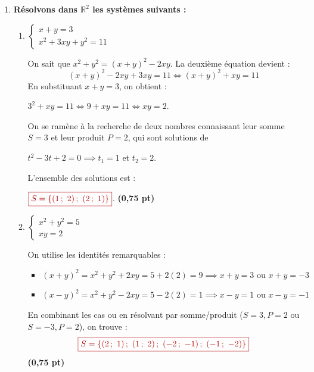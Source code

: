 \documentclass[12pt,a4paper]{article}
\newcommand{\redtitle}[1]{\textcolor{myred}{\textbf{#1}}}
\newcommand{\redbox}[1]{\color{myred}\boxed{#1}\color{black}}
\begin{document}
\begin{enumerate}
\begin{enumerate}
        L'ensemble des solutions est : 
        
        $\redbox{S = \left[ -\infty \,;~ -\dfrac{5}{2} \right] \cup ]-2 \,;~ 1] \cup ]5 \,;~ +\infty[}$. \hfill \textbf{(0,75 pt)}
    \end{enumerate}

    \item \redtitle{Résolvons dans $\mathbb{R}^2$ les systèmes suivants :}
    
    \begin{enumerate}
        \item $\begin{cases} x + y = 3 \\ x^2 + 3xy + y^2 = 11 \end{cases}$
        
        On sait que $x^2 + y^2 = (x+y)^2 - 2xy$. La deuxième équation devient :
        \[ (x+y)^2 - 2xy + 3xy = 11 \iff (x+y)^2 + xy = 11 \]
        En substituant $x+y=3$, on obtient :
        
         $3^2 + xy = 11 \iff 9 + xy = 11 \iff xy = 2$.
        
        On se ramène à la recherche de deux nombres connaissant leur somme $S=3$ et leur produit $P=2$, qui sont solutions de 
        
        $t^2 - 3t + 2 = 0 \implies t_1 = 1$ et $t_2 = 2$.
        
        L'ensemble des solutions est :
        
         $\redbox{S = \{(1 \,;~ 2) \,;~ (2 \,;~ 1)\}}$. \hfill \textbf{(0,75 pt)}
        
        \item $\begin{cases} x^2 + y^2 = 5 \\ xy = 2 \end{cases}$
        
        On utilise les identités remarquables :
        \begin{itemize}
            \item $(x+y)^2 = x^2 + y^2 + 2xy = 5 + 2(2) = 9 \implies x + y = 3 \text{ ou } x + y = -3$
            \item $(x-y)^2 = x^2 + y^2 - 2xy = 5 - 2(2) = 1 \implies x - y = 1 \text{ ou } x - y = -1$
        \end{itemize}
        En combinant les cas ou en résolvant par somme/produit ($S=3, P=2$ ou $S=-3, P=2$), on trouve :
        \[ \redbox{S = \{(2 \,;~ 1) \,;~ (1 \,;~ 2) \,;~ (-2 \,;~ -1) \,;~ (-1 \,;~ -2)\}} \] \hfill \textbf{(0,75 pt)}
        

\end{enumerate}
\end{enumerate}
\end{document}
